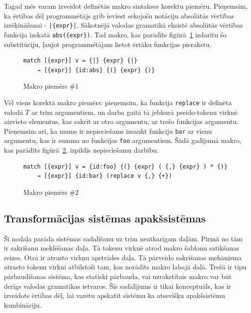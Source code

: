 Tagad mēs varam izveidot definētās makro sintakses korektu piemēru. Pieņemsim, ka ērtības dēļ programmētājs grib ieviest sekojošu notāciju absolūtās vērtības izrēķināšanai - \verb/|{expr}|/. Sākotnējā valodas gramatikā eksistē absolūtās vērtības funkcija izskatā \verb|abs({expr})|. Tad makro, kas parādīts figūrā~\ref{fig:matchsample1} izdarītu šo substitūciju, ļaujot programmētājam lietot ērtāku funkcijas pierakstu.

\begin{figure}[h!]
\begin{verbatim}
match [{expr}] v = {|} {expr} {|}
    → [{expr}] {id:abs} {(} {expr} {)}
\end{verbatim}
\caption{\label{fig:matchsample1}Makro piemērs \#1}
\end{figure}

Vēl viens korektā makro piemērs: pieņemsim, ka funkcija \verb|replace| ir definēta valodā $T$ ar trim argumentiem, un darba gaitā tā jebkurā pseido-tokenu virknē aizvieto elementus, kas sakrīt ar otro argumentu, ar trešo funkcijas argumentu. Pieņemsim arī, ka mums ir nepieciešams izsaukt funkciju \verb|bar| ar vienu argumentu, kas ir summa no funkcijas \verb|foo| argumentiem. Šādā gadījumā makro, kas parādīts figūrā~\ref{fig:matchsample2}, izpildīs nepieciešamu darbību.

\begin{figure}[h!]
\begin{verbatim}
match [{expr}] v = {id:foo} {(} {expr} ( {,} {expr} ) * {)}
    → [{expr}] {id:bar} (replace v {,} {+})
\end{verbatim}
\caption{\label{fig:matchsample2}Makro piemērs \#2}
\end{figure}

\subsection{\label{sbs:sys_qualities}Transformācijas sistēmas apakšsistēmas}

Šī nodaļa parāda sistēmas sadalīšanu uz trim neatkarīgam daļām. Pirmā no tām ir sakrišanu meklēšanas daļa. Tā tokenu virknē atrod makro šablonu satikšanas reizes. Otrā ir atrasto virkņu apstrādes daļa. Tā pārveido sakrišanas mehānisma atrasto tokenu virkni atbilstoši tam, kas norādīts makro labajā daļā. Trešā ir tipu pārbaudīšanas sistēma, kas statiski pārbauda, vai uzrakstītais makro var būt derīgs valodas gramatikas ietvaros. Šīs sadalījums ir tikai konceptuāls, kas ir izveidots ērtības dēļ, lai varētu apskatīt sistēmu ka atsevišķu apakšsistēmu kombināciju.

